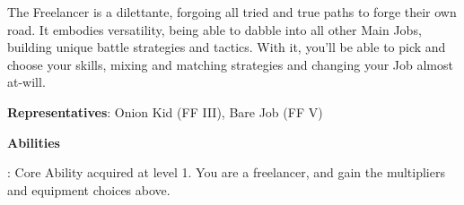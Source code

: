 \begin{jobdesc}[name=pjob-freelancer]
    The Freelancer is a dilettante, forgoing all tried and true paths to forge their own road. It embodies versatility, being able to dabble into all other Main Jobs, building unique battle strategies and tactics. With it, you’ll be able to pick and choose your skills, mixing and matching strategies and changing your Job almost at-will. \pc%

    \textbf{Representatives}: Onion Kid (FF III), Bare Job (FF V) \pc%

    \jobstats[hpa=3x,hpb=4x,hpc=5x,hpd=6x,mpa=1x,mpb=2x,mpc=3x,armor=none,weapons=none]
\end{jobdesc}

\begin{ffminipage}
{\centering \textbf{Abilities}\par }

\noindent{}: Core Ability acquired at level 1. You are a freelancer, and gain the multipliers and equipment choices above.


\end{ffminipage}
